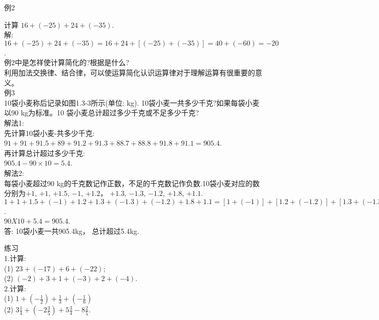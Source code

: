 \documentclass{article}
\begin{document}
\begin{example}
    
    例2
    
    计算 $16+(-25)+24+(-35)$.\\
    
    解: $16+(-25)+24+(-35)=16+24+[(-25)+(-35)]=40+(-60)=-20$.\\
    
    例2中是怎祥使计算简化的?根据是什么?\\
    
    利用加法交换律、结合律，可以使运算简化认识运算律对于理解运算有很重要的意义。\\
    
    例3\\
    
    10袋小麦称后记录如图1.3-3所示(单位: kg). 10袋小麦一共多少千克?如果每袋小麦以90 kg为标准。10 袋小麦总计超过多少千克或不足多少千克?\\
    
    解法1:\\
    
    先计算10袋小麦-共多少千克:\\

    $91+91+91.5+89+91.2+91.3+88.7+88.8+91.8+91.1=905.4$.\\
    
    再计算总计超过多少千克:\\
    
    $905.4-90\times10=5.4$.\\

    解法2:\\
    每袋小麦超过90 kg的千克数记作正数，不足的千克数记作负数.10袋小麦对应的数分别为$+1$, $+1$, $+1.5$, $-1$, $+1.2$， $+1.3$, $-1.3$, $- 1.2$, $+1.8$, $+1.1$.\\

    $1+1+1.5+(-1)+1.2+1.3+(-1.3)+(-1.2)+1.8+1.1=[1+(-1)]+[1.2+(-1.2)]+[1.3+(- 1.3)]+(1+1.5+1.8+1.1)=5.4$.\\
    
    $90X10+5.4=905.4$.\\

    答: 10袋小麦一共905.4kg， 总计超过5.4kg.\\
    
\end{example}

\begin{exercise}
    
    练习\\

    1.计算:\\

    (1) $23+(-17)+6+(-22)$;\\
    
    (2) $(-2)+3+1+(-3)+2+(-4)$.\\

    2.计算:\\

    (1) $1+(-\frac{1}{2})+\frac{1}{3}+(-\frac{1}{6})$\\
    
    (2) $3\frac{1}{4}+(-2\frac{3}{5})+5\frac{3}{4}-8\frac{2}{5}$.\\
    
\end{exercise}
    
    
    
    
\end{document}
